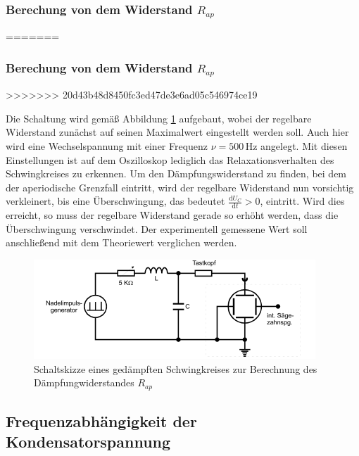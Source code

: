 \subsubsection{Berechung von dem Widerstand $R_{ap}$}
=======
\subsubsection{Berechung von dem Widerstand $R_{ap}$}
\label{sec:ap}
>>>>>>> 20d43b48d8450fc3ed47de3e6ad05c546974ce19

Die Schaltung wird gemäß Abbildung \ref{fig:gsk3} aufgebaut, wobei der regelbare Widerstand zunächst
auf seinen Maximalwert eingestellt werden soll. Auch hier wird eine Wechselspannung mit einer
Frequenz $\nu = 500\, \si{\hertz}$ angelegt. Mit diesen Einstellungen ist auf dem Oszilloskop
lediglich das Relaxationsverhalten des Schwingkreises zu erkennen. Um den Dämpfungswiderstand 
zu finden, bei dem der aperiodische Grenzfall eintritt, wird der regelbare Widerstand nun vorsichtig
verkleinert, bis eine Überschwingung, das bedeutet $\frac{\mathrm{d}U_C}{\mathrm{d}t} > 0$, eintritt.
Wird dies erreicht, so muss der regelbare Widerstand gerade so erhöht werden, dass die Überschwingung
verschwindet. Der experimentell gemessene Wert soll anschließend mit dem Theoriewert verglichen werden.

\begin{figure}[H]
  \centering
  \includegraphics{content/aufgabeB.png}
  \caption{Schaltskizze eines gedämpften Schwingkreises zur Berechnung des Dämpfungwiderstandes $R_{ap}$ \cite{sample354}}
  \label{fig:gsk3}
\end{figure}


\subsection{Frequenzabhängigkeit der Kondensatorspannung}

